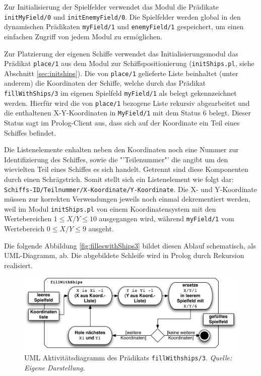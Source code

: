 	Zur Initialisierung der Spielfelder verwendet das Modul die Prädikate \texttt{initMyField/0} und \texttt{initEnemyField/0}.
	Die Spielfelder werden global in den dynamischen Prädikaten \texttt{myField/1} und \texttt{enemyField/1}
	gespeichert, um einen einfachen Zugriff von jedem Modul zu ermöglichen. 
	 
	Zur Platzierung der eigenen Schiffe verwendet das Initialisierungsmodul das Prädikat \texttt{place/1} aus dem Modul zur 
	Schiffspositionierung (\texttt{initShips.pl}, siehe Abschnitt \ref{sec:initships}).
	Die von \texttt{place/1} gelieferte Liste beinhaltet (unter anderem) die Koordinaten der Schiffe, welche durch das Prädikat 
	\texttt{fillWithShips/3} im eigenen Spielfeld \texttt{myField/1} als belegt gekennzeichnet werden. Hierfür wird 
	die von \texttt{place/1} bezogene Liste rekursiv abgearbeitet und die enthaltenen X-Y-Koordinaten in \texttt{MyField/1} mit dem 
	Status 6 belegt. Dieser Status sagt im Prolog-Client aus, dass sich auf der Koordinate ein Teil eines Schiffes befindet.
	
	Die Listenelemente enhalten neben den Koordinaten noch eine Nummer zur Identifizierung des Schiffes, sowie die "'Teilenummer"' 
	die angibt um den wievielten Teil eines Schiffes es sich handelt. Getrennt sind diese Komponenten durch einen Schrägstrich. Somit 
	stellt sich ein Listenelement wie folgt dar: \texttt{Schiffs-ID/Teilnummer/X-Koordinate/Y-Koordinate}.
	Die X- und Y-Koordinate müssen zur korrekten Verwendungen jeweils noch einmal dekrementiert werden, weil im Modul \texttt{initShips.pl} von 
	einem Koordinatensystem mit den Wertebereichen $1\le X/Y\le 10$ ausgegangen wird, während \texttt{myField/1} vom Wertebereich $0\le X/Y\le 9$ ausgeht.
	
	Die folgende Abbildung \ref{fig:filleswithShips3} bildet diesen Ablauf schematisch, als UML-Diagramm, ab. Die abgebildete Schleife 
	wird in Prolog durch Rekursion realisiert.
	\begin{figure}[H] %
		\centering
		\includegraphics[width=.9\textwidth]{images/fillWithShips.pdf}
		\caption{UML Aktivitätsdiagramm des Prädikats \texttt{fillWithships/3}. \emph{Quelle: Eigene Darstellung.}}
		\label{fig:fillwithShips3}
	\end{figure}

